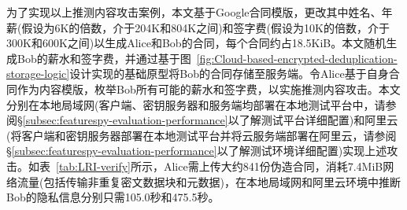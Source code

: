 为了实现以上推测内容攻击案例，本文基于Google合同模版\cite{GoogleOffer}，更改其中姓名、年薪(假设为6K的倍数\cite{harnik2010side}，介于204K和804K之间)和签字费(假设为10K的倍数，介于300K和600K之间)以生成Alice和Bob的合同，每个合同约占18.5KiB。本文随机生成Bob的薪水和签字费，并通过基于图~\ref{fig:Cloud-based-encrypted-deduplication-storage-logic}设计实现的基础原型将Bob的合同存储至服务端。令Alice基于自身合同作为内容模版，枚举Bob所有可能的薪水和签字费，以实施推测内容攻击。本文分别在本地局域网(客户端、密钥服务器和服务端均部署在本地测试平台中，请参阅\S\ref{subsec:featurespy-evaluation-performance}以了解测试平台详细配置)和阿里云(将客户端和密钥服务器部署在本地测试平台并将云服务端部署在阿里云\cite{Alibaba}，请参阅 \S\ref{subsec:featurespy-evaluation-performance}以了解测试环境详细配置)实现上述攻击。如表~\ref{tab:LRI-verify}所示，Alice需上传大约841份伪造合同，消耗7.4MiB网络流量(包括传输非重复密文数据块和元数据)，在本地局域网和阿里云环境中推断Bob的隐私信息分别只需105.0秒和475.5秒。
